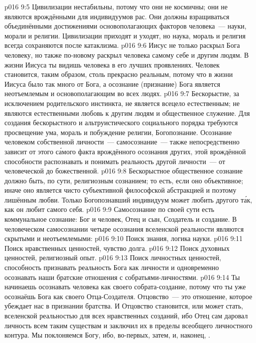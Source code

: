 \vs p016 9:5 Цивилизации нестабильны, потому что они не космичны; они не являются врождёнными для индивидуумов рас. Они должны взращиваться объединёнными достижениями основополагающих факторов человека~--- науки, морали и религии. Цивилизации приходят и уходят, но наука, мораль и религия всегда сохраняются после катаклизма.
\vs p016 9:6 Иисус не только раскрыл Бога человеку, но также по\hyp{}новому раскрыл человека самому себе и другим людям. В жизни Иисуса ты видишь человека в его лучших проявлениях. Человек становится, таким образом, столь прекрасно реальным, потому что в жизни Иисуса было так много от Бога, а осознание (признание) Бога является неотъемлемым и основополагающим во всех людях.
\vs p016 9:7 \pc Бескорыстие, за исключением родительского инстинкта, не является всецело естественным; не являются естественными любовь к другим людям и общественное служение. Для создания бескорыстного и альтруистического социального порядка требуются просвещение ума, мораль и побуждение религии, Богопознание. Осознание человеком собственной личности~--- самосознание~--- также непосредственно зависит от этого с\'амого факта врождённого осознания других, этой врождённой способности распознавать и понимать реальность другой личности~--- от человеческой до божественной.
\vs p016 9:8 Бескорыстное общественное сознание должно быть, по сути, религиозным сознанием; то есть, если оно объективное; иначе оно является чисто субъективной философской абстракцией и поэтому лишённым любви. Только Богопознавший индивидуум может любить другого т\'ак, как он любит самого себя.
\vs p016 9:9 Самосознание по своей сути есть коммунальное сознание: Бог и человек, Отец и сын, Создатель и создание. В человеческом самосознании четыре осознания вселенской реальности являются скрытыми и неотъемлемыми:
\vs p016 9:10 Поиск знания, логика науки.
\vs p016 9:11 Поиск нравственных ценностей, чувство долга.
\vs p016 9:12 Поиск духовных ценностей, религиозный опыт.
\vs p016 9:13 Поиск личностных ценностей, способность признавать реальность Бога как личности и одновременно осознавать наши братские отношения с собратьями\hyp{}личностями.
\vs p016 9:14 \pc Ты начинаешь осознавать человека как своего собрата\hyp{}создание, потому что ты уже осознаёшь Бога как своего Отца\hyp{}Создателя. Отцовство~--- это отношение, которое убеждает нас в признании братства. И Отцовство становится, или может стать, вселенской реальностью для всех нравственных созданий, ибо Отец сам даровал личность всем таким существам и заключил их в пределы всеобщего личностного контура. Мы поклоняемся Богу, ибо, во\hyp{}первых,  затем,  и, наконец, .
